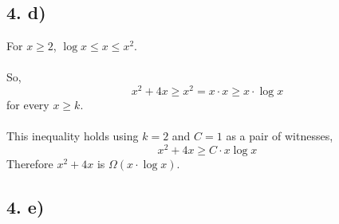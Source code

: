 \documentclass[]{article}
\begin{document}
\subsection{4. d)}
For $x \geq 2$, $\log x \leq x \leq x^2$.
\\
\\
So,
$$x^2+4x \geq x^2 = x \cdot x \geq x \cdot \log x$$
for every $x \geq k$.
\\
\\
This inequality holds using $k = 2$ and $C = 1$ as a pair of witnesses,
$$x^2+4x \geq C \cdot x \log x$$
Therefore $x^2+4x$ is $\Omega (x \cdot \log x)$.
\subsection{4. e)}
\end{document}
